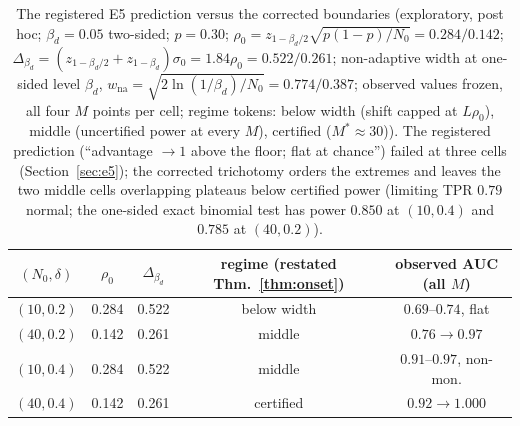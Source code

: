 \begin{table}[t]\centering\scriptsize
\setlength{\tabcolsep}{3.5pt}
\begin{tabular}{@{}ccccc@{}}
\toprule
$(N_0,\delta)$ & $\rho_0$ & $\Delta_{\beta_d}$ &
regime (restated Thm.~\ref{thm:onset}) & observed AUC (all $M$) \\
\midrule
$(10,0.2)$ & 0.284 & 0.522 & below width & $0.69$--$0.74$, flat \\
$(40,0.2)$ & 0.142 & 0.261 & middle & $0.76\to0.97$ \\
$(10,0.4)$ & 0.284 & 0.522 & middle & $0.91$--$0.97$, non-mon. \\
$(40,0.4)$ & 0.142 & 0.261 & certified & $0.92\to1.000$ \\
\bottomrule
\end{tabular}
\caption{The registered E5 prediction versus the corrected boundaries
(exploratory, post hoc; $\beta_d=0.05$ two-sided; $p=0.30$;
$\rho_0=z_{1-\beta_d/2}\sqrt{p(1-p)/N_0}=0.284/0.142$;
$\Delta_{\beta_d}=(z_{1-\beta_d/2}+z_{1-\beta_d})\sigma_0=1.84\rho_0=0.522/0.261$;
non-adaptive width at one-sided level $\beta_d$,
$w_{\mathrm{na}}=\sqrt{2\ln(1/\beta_d)/N_0}=0.774/0.387$;
observed values frozen, all four $M$ points per cell; regime tokens: below
width (shift capped at $L\rho_0$), middle (uncertified power at every $M$),
certified ($M^{*}\!\approx\!30$)). The registered
prediction (``advantage $\to1$ above the floor; flat at chance'') failed
at three cells (Section~\ref{sec:e5}); the corrected trichotomy orders the
extremes and leaves the two middle cells overlapping plateaus below
certified power (limiting TPR $0.79$ normal; the one-sided exact binomial
test has power $0.850$ at $(10,0.4)$ and $0.785$ at $(40,0.2)$).}
\label{tab:widths}
\end{table}
